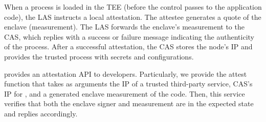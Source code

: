 When a \projecttitle{} process is loaded in the TEE (before the control passes to the application code), the LAS instructs a local attestation. The attestee generates a quote of the enclave (measurement). The LAS forwards the enclave's measurement to the CAS, which replies with a success or failure message indicating the authenticity of the process. After a successful attestation, the CAS stores the node's IP and provides the trusted process with secrets and configurations.

\projecttitle{} provides an attestation API to developers. Particularly, we provide the attest function that takes as arguments the IP of a trusted third-party service, CAS's IP for \projecttitle{}, and a generated enclave measurement of the code. Then, this service verifies that both the enclave signer and measurement are in the expected state and replies accordingly.
\fi 



